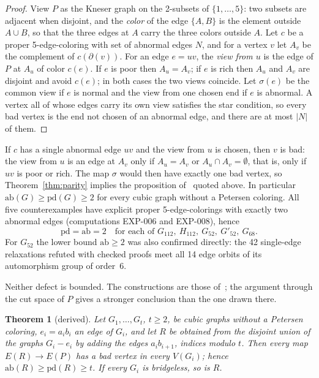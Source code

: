 \documentclass[11pt]{article}
\newtheorem{theorem}{Theorem}[section]
\theoremstyle{definition}
\theoremstyle{remark}
\newcommand{\PG}{P}
\newcommand{\Gmain}{G_{112}}
\newcommand{\Gsym}{H_{112}}
\newcommand{\Gfty}{G_{52}}
\newcommand{\Gftyb}{G'_{52}}
\newcommand{\Gsix}{G_{68}}
\newcommand{\pd}{\mathrm{pd}}
\newcommand{\ab}{\mathrm{ab}}
\begin{document}
\begin{proof}
View $\PG$ as the Kneser graph on the 2-subsets of $\{1,\dots,5\}$: two subsets are adjacent when
disjoint, and the \emph{color} of the edge $\{A, B\}$ is the element outside $A \cup B$, so that
the three edges at $A$ carry the three colors outside $A$. Let $c$ be a proper 5-edge-coloring with
set of abnormal edges $N$, and for a vertex $v$ let $A_v$ be the complement of $c(\partial(v))$.
For an edge $e = uv$, the \emph{view from $u$} is the edge of $\PG$ at $A_u$ of color $c(e)$. If
$e$ is poor then $A_u = A_v$; if $e$ is rich then $A_u$ and $A_v$ are disjoint and avoid $c(e)$; in
both cases the two views coincide. Let $\sigma(e)$ be the common view if $e$ is normal and the view
from one chosen end if $e$ is abnormal. A vertex all of whose edges carry its own view satisfies
the star condition, so every bad vertex is the end not chosen of an abnormal edge, and there are
at most $|N|$ of them.
\end{proof}

If $c$ has a single abnormal edge $uv$ and the view from $u$ is chosen, then $v$ is bad: the view
from $u$ is an edge at $A_v$ only if $A_u = A_v$ or $A_u \cap A_v = \emptyset$, that is, only if
$uv$ is poor or rich. The map $\sigma$ would then have exactly one bad vertex, so
Theorem~\ref{thm:parity} implies the proposition of~\cite{MMM2021} quoted above. In particular
$\ab(G) \ge \pd(G) \ge 2$ for every cubic graph without a Petersen coloring. All five counterexamples have explicit proper 5-edge-colorings with exactly two abnormal
edges (computations EXP-006 and EXP-008), hence
\[
\pd = \ab = 2 \quad\text{for each of } \Gmain,\ \Gsym,\ \Gfty,\ \Gftyb,\ \Gsix .
\]
For $\Gfty$ the lower bound $\ab \ge 2$ was also confirmed directly: the 42 single-edge
relaxations refuted with checked proofs meet all 14 edge orbits of its automorphism group of
order~6.

Neither defect is bounded. The constructions are those of~\cite{MMM2021}; the argument through the
cut space of $\PG$ gives a stronger conclusion than the one drawn there.

\begin{theorem}[derived]\label{thm:rings}
Let $G_1, \dots, G_t$, $t \ge 2$, be cubic graphs without a Petersen coloring, $e_i = a_ib_i$ an
edge of $G_i$, and let $R$ be obtained from the disjoint union of the graphs $G_i - e_i$ by adding
the edges $a_ib_{i+1}$, indices modulo $t$. Then every map $E(R) \to E(\PG)$ has a bad vertex in
every $V(G_i)$; hence $\ab(R) \ge \pd(R) \ge t$. If every $G_i$ is bridgeless, so is $R$.
\end{theorem}
\end{document}
